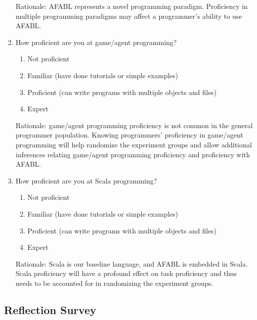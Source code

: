 \begin{enumerate}
Rationale: AFABL represents a novel programming paradigm.  Proficiency in multiple programming paradigms may affect a programmer’s ability to use AFABL.

\item How proficient are you at game/agent programming?  
\begin{enumerate}
\item Not proficient
\item Familiar (have done tutorials or simple examples)
\item Proficient (can write programs with multiple objects and files)
\item Expert
\end{enumerate}

Rationale: game/agent programming proficiency is not common in the general programmer population.  Knowing programmers’ proficiency in game/agent programming will help randomize the experiment groups and allow additional inferences relating game/agent programming proficiency and proficiency with AFABL.

\item How proficient are you at Scala programming?  
\begin{enumerate}
\item Not proficient
\item Familiar (have done tutorials or simple examples)
\item Proficient (can write programs with multiple objects and files)
\item Expert
\end{enumerate}

Rationale: Scala is our baseline language, and AFABL is embedded in Scala.  Scala proficiency will have a profound effect on task proficiency and thus needs to be accounted for in randomizing the experiment groups.

\end{enumerate}



\subsection{Reflection Survey}

